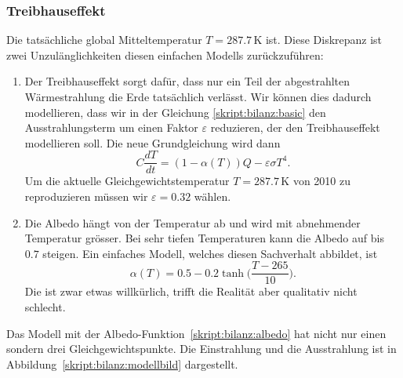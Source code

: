 \subsubsection{Treibhauseffekt}
Die tatsächliche global Mitteltemperatur $T=287.7\,\text{K}$ ist.
Diese Diskrepanz ist zwei Unzulänglichkeiten diesen einfachen
Modells zurückzuführen:
\begin{enumerate}
\item
Der Treibhauseffekt sorgt dafür, dass nur ein Teil der abgestrahlten
Wärmestrahlung die Erde tatsächlich verlässt.
Wir können dies dadurch modellieren, dass wir in der Gleichung
\eqref{skript:bilanz:basic} den Ausstrahlungsterm um einen Faktor
$\varepsilon$ reduzieren, der den Treibhauseffekt modellieren soll.
Die neue Grundgleichung wird dann
\begin{equation}
C\frac{dT}{dt}
=
(1-\alpha(T)) Q - \varepsilon\sigma T^4.
\label{skript:bilanz:basic2}
\end{equation}
Um die aktuelle Gleichgewichtstemperatur $T=287.7\,\text{K}$ von 2010
zu reproduzieren müssen wir $\varepsilon=0.32$ wählen.
\item
Die Albedo hängt von der Temperatur ab und wird mit abnehmender 
Temperatur grösser.
Bei sehr tiefen Temperaturen kann die Albedo auf bis $0.7$ steigen.
Ein einfaches Modell,
welches diesen Sachverhalt abbildet, ist
\begin{equation}
\alpha(T)=0.5-0.2\tanh\biggl(\frac{T-265}{10}\biggr).
\label{skript:bilanz:albedo}
\end{equation}
Die ist zwar etwas willkürlich, trifft die Realität aber qualitativ nicht
schlecht.
\end{enumerate}
Das Modell mit der Albedo-Funktion~\eqref{skript:bilanz:albedo}
hat nicht nur einen sondern drei Gleichgewichtspunkte.
Die Einstrahlung und die Ausstrahlung ist in
Abbildung~\ref{skript:bilanz:modellbild} dargestellt.

